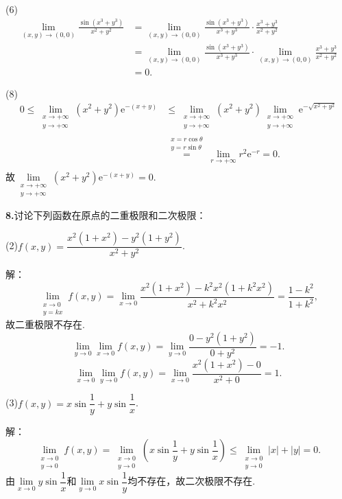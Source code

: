\documentclass[12pt, a4paper]{article}
\newcommand{\e}{\mathrm{e}}
\begin{document}
(6)
\begin{align*}
\lim_{(x, y) \to (0, 0)} \frac{\sin(x^3 + y^3)}{x^2 + y^2} &= \lim_{(x, y) \to (0, 0)} \frac{\sin(x^3 + y^3)}{x^3 + y^3} \cdot \frac{x^3 + y^3}{x^2 + y^2} \\
&= \lim_{(x, y) \to (0, 0)} \frac{\sin(x^3 + y^3)}{x^3 + y^3} \cdot \lim_{(x, y) \to (0, 0)} \frac{x^3 + y^3}{x^2 + y^2} \\
&= 0.
\end{align*}

(8)
\begin{align*}
0 \leq \lim_{\substack{x \to +\infty \\ y \to +\infty}} (x^2 + y^2)\e^{-(x + y)} &\leq \lim_{\substack{x \to +\infty \\ y \to +\infty}} (x^2 + y^2) \lim_{\substack{x \to +\infty \\ y \to +\infty}} \e^{-\sqrt{x^2 + y^2}} \\
&\overset{\substack{x = r\cos\theta \\ y = r\sin\theta}}{=} \lim_{r \to +\infty} r^2 \e^{-r} = 0.\\
\end{align*}
故\(\lim\limits_{\substack{x \to +\infty \\ y \to +\infty}} (x^2 + y^2)\e^{-(x + y)} = 0.\)

\textbf{8.}讨论下列函数在原点的二重极限和二次极限：

(2)\(f(x, y) = \dfrac{x^2(1 + x^2) - y^2(1 + y^2)}{x^2 + y^2}\).

解：
\[\lim_{\substack{x \to 0 \\ y = kx}}f(x, y) = \lim_{x \to 0}\dfrac{x^2(1 + x^2) - k^2x^2(1 + k^2x^2)}{x^2 + k^2x^2} = \dfrac{1 - k^2}{1 + k^2},\]
故二重极限不存在.
\[\lim_{y \to 0} \lim_{x \to 0} f(x, y) = \lim_{y \to 0} \dfrac{0 - y^2(1 + y^2)}{0 + y^2} = -1.\]
\[\lim_{x \to 0} \lim_{y \to 0} f(x, y) = \lim_{x \to 0} \dfrac{x^2(1 + x^2) - 0}{x^2 + 0} = 1.\]

(3)\(f(x, y) = x\sin\dfrac{1}{y} + y\sin\dfrac{1}{x}\).

解：
\[\lim_{\substack{x \to 0 \\ y \to 0}} f(x, y) = \lim_{\substack{x \to 0 \\ y \to 0}} \left(x\sin\dfrac{1}{y} + y\sin\dfrac{1}{x}\right) \leq \lim\limits_{\substack{x \to 0 \\ y \to 0}} |x| + |y| = 0.\]
由\(\lim\limits_{x \to 0} y\sin\dfrac{1}{x}\)和\(\lim\limits_{y \to 0} x\sin\dfrac{1}{y}\)均不存在，故二次极限不存在.
\end{document}

